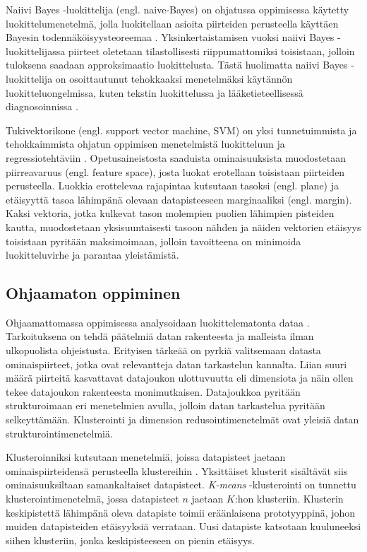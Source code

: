 \documentclass[utf8]{gradu3}
\begin{document}
Naiivi Bayes -luokittelija (engl. naive-Bayes) on ohjatussa oppimisessa käytetty luokittelumenetelmä, jolla luokitellaan asioita piirteiden perusteella käyttäen Bayesin todennäköisyysteoreemaa \parencite{nasteski2017overview,rish2001empirical}. Yksinkertaistamisen vuoksi naiivi Bayes -luo\-kit\-te\-li\-jas\-sa piirteet oletetaan tilastollisesti riippumattomiksi toisistaan, jolloin tuloksena saadaan approksimaatio luokittelusta. Tästä huolimatta naiivi Bayes -luokittelija on osoittautunut tehokkaaksi menetelmäksi käytännön luokitteluongelmissa, kuten tekstin luokittelussa ja lääketieteellisessä diagnosoinnissa \parencite{rish2001empirical}.

Tukivektorikone (engl. support vector machine, SVM) on yksi tunnetuimmista ja tehokkaimmista ohjatun oppimisen menetelmistä luokitteluun ja regressiotehtäviin \parencite{cervantes2020comprehensive,osisanwo2017supervised}. Opetusaineistosta saaduista ominaisuuksista muodostetaan piirreavaruus (engl. feature space), josta luokat erotellaan toisistaan piirteiden perusteella. Luokkia erottelevaa rajapintaa kutsutaan tasoksi (engl. plane) ja etäisyyttä tasoa lähimpänä olevaan datapisteeseen marginaaliksi (engl. margin). Kaksi vektoria, jotka kulkevat tason molempien puolien lähimpien pisteiden kautta, muodostetaan yksisuuntaisesti tasoon nähden ja näiden vektorien etäisyys toisistaan pyritään maksimoimaan, jolloin tavoitteena on minimoida luokitteluvirhe ja parantaa yleistämistä.

\subsection{Ohjaamaton oppiminen}

Ohjaamattomassa oppimisessa analysoidaan luokittelematonta dataa \parencite{das2017survey,jordan2015machine}. Tarkoituksena on tehdä päätelmiä datan rakenteesta ja malleista ilman ulkopuolista ohjeistusta. Erityisen tärkeää on pyrkiä valitsemaan datasta ominaispiirteet, jotka ovat relevantteja datan tarkastelun kannalta. Liian suuri määrä piirteitä kasvattavat datajoukon ulottuvuutta eli dimensiota ja näin ollen tekee datajoukon rakenteesta monimutkaisen. Datajoukkoa pyritään strukturoimaan eri menetelmien avulla, jolloin datan tarkastelua pyritään selkeyttämään. Klusterointi ja dimension redusointimenetelmät ovat yleisiä datan strukturointimenetelmiä.

Klusteroinniksi kutsutaan menetelmiä, joissa datapisteet jaetaan ominaispiirteidensä perusteella klustereihin \parencite{usama2019unsupervised}. Yksittäiset klusterit sisältävät siis ominaisuuksiltaan samankaltaiset datapisteet. \textit{K-means} -klusterointi on tunnettu klusterointimenetelmä, jossa datapisteet \(n\) jaetaan \(K\):hon klusteriin. Klusterin keskipistettä lähimpänä oleva datapiste toimii eräänlaisena prototyyppinä, johon muiden datapisteiden etäisyyksiä verrataan. Uusi datapiste katsotaan kuuluneeksi siihen klusteriin, jonka keskipisteeseen on pienin etäisyys.
\end{document}
